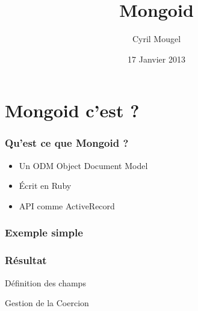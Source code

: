 \documentclass{beamer}
\title{Mongoid}
\author{Cyril Mougel}
\date{17 Janvier 2013}
\begin{document}
\begin{frame}
    \titlepage
\end{frame}

\section{Mongoid c'est ?}

\begin{frame}
  \frametitle{Qu'est ce que Mongoid ?}
  \begin{itemize}
    \item Un ODM Object Document Model
    \item Écrit en Ruby
    \item API comme ActiveRecord
  \end{itemize}
\end{frame}

\begin{frame}
  \frametitle{Exemple simple}
  
\end{frame}

\begin{frame}
  \frametitle{Résultat}
  
\end{frame}

\begin{frame}
  \begin{center}
    \Huge{}
    Définition des champs
  \end{center}
\end{frame}

\begin{frame}
  
\end{frame}

\begin{frame}
  
\end{frame}

\begin{frame}
  \begin{center}
    \Huge{}
    Gestion de la Coercion
  \end{center}
\end{frame}

\begin{frame}
  
\end{frame}

\begin{frame}
  
\end{frame}
\end{document}

